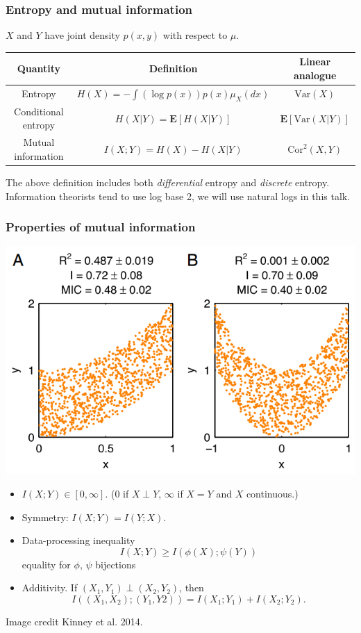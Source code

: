 \documentclass{beamer}
\newcommand{\E}{\textbf{E}}
\begin{document}
\begin{frame}
\frametitle{Entropy and mutual information}
$X$ and $Y$ have joint density $p(x, y)$ with respect to $\mu$.

\vspace{0.5in}

\begin{tabular}{c|c|c}
\hline
Quantity & Definition & Linear analogue\\\hline
Entropy & $H(X) = - \int (\log p(x)) p(x) \mu_X(dx)$ & $\text{Var}(X)$\\
Conditional entropy & $H(X|Y) = \E[H(X|Y)]$ & $\E[\text{Var}(X|Y)]$\\
Mutual information & $I(X;Y) = H(X) - H(X|Y)$ & $\text{Cor}^2(X, Y)$\\\hline
\end{tabular}

\vspace{0.3in}

\small{The above definition includes both \emph{differential} entropy and \emph{discrete} entropy.
Information theorists tend to use log base 2, we will use natural logs in this talk.}
\end{frame}

\begin{frame}
\frametitle{Properties of mutual information}
\begin{center}
\includegraphics[scale = 0.2]{kinney.png}
\end{center}
\begin{itemize}
\item $I(X;Y) \in [0,\infty]$.  (0 if $X \perp Y$, $\infty$ if $X=Y$ and $X$ continuous.)
\item Symmetry: $I(X;Y) = I(Y; X)$.
\item Data-processing inequality
\[I(X; Y) \geq I(\phi(X); \psi(Y))\]
equality for $\phi$, $\psi$ bijections
\item Additivity.  If $(X_1,Y_1) \perp (X_2, Y_2)$, then
\[
I((X_1, X_2); (Y_1, Y2)) = I(X_1; Y_1) + I(X_2; Y_2).
\]
\end{itemize}
\tiny{Image credit Kinney et al. 2014.}
\end{frame}
\end{document}
